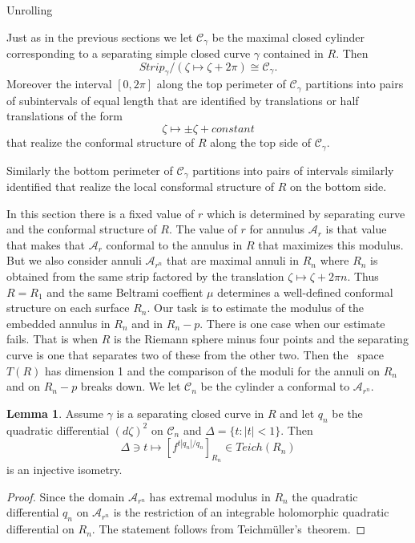 \documentclass[12pt]{amsart}
\newcommand{\tes}{Teich\-m\"ul\-ler's}
\theoremstyle{remark}
\theoremstyle{definition}
\theoremstyle{definition}
\newtheorem{lemma}{Lemma}
\begin{document}
\begin{section}{Unrolling}

Just as in the previous sections we let ${\mathcal C}_{\gamma}$ be the maximal closed cylinder  corresponding to a separating simple closed curve $\gamma$ contained in $R.$ Then 
$$Strip_{\gamma}/(\zeta \mapsto \zeta+2\pi) \cong {\mathcal C}_{\gamma}.$$ 
Moreover the interval $[0,2\pi]$ along the top perimeter of ${\mathcal C}_{\gamma}$ partitions into pairs of subintervals of equal length that are identified by translations or half translations of the form 
      $$ \zeta \mapsto \pm \zeta + constant$$
      that realize the conformal structure of $R$ along the top side of 
            ${\mathcal C}_{\gamma}.$
            
            Similarly the bottom perimeter of ${\mathcal C}_{\gamma}$ partitions into pairs of intervals similarly identified that realize the local consformal structure of $R$ on the bottom side.
 
 In this section there is a fixed value of $r$ which is determined by separating curve and the conformal structure of $R.$  The value of $r$ for annulus ${\mathcal A}_r$ is that value that makes that 
 ${\mathcal A}_r$ conformal to the annulus in $R$ that maximizes this modulus.  But we also consider annuli  ${\mathcal A}_{r^n}$ that are maximal annuli in $R_n$ where $R_n$ is obtained from the same strip factored by the translation $\zeta \mapsto \zeta + 2 \pi n.$ Thus $R=R_1$ and the same Beltrami coeffient $\mu$
 determines a well-defined conformal structure on each surface $R_n.$ Our task is to estimate the modulus of the embedded annulus in $R_n$ and in $R_n - p.$  There is one case when our estimate fails.  That is when $R$ is the Riemann sphere minus four points and the separating curve is one that separates two of these from the other two.  Then the \te\ space $T(R)$ has dimension 1 and the comparison of the moduli for the annuli on $R_n$ and on $R_n-p$ breaks down.
 We let ${\mathcal C}_n$ be the cylinder a conformal to ${\mathcal A}_{r^n}.$
   
 
 
 

 
 \begin{lemma}\label{lemmaeight} Assume $\gamma$ is a separating closed curve in $R$ and let $q_n$ be the quadratic differential $(d\zeta)^2$ on ${\mathcal C}_n$ and $\Delta= \{t:|t|<1\}.$  Then 
 $$\Delta \ni t \mapsto [f^{t|q_n|/q_n}]_{R_n} \in Teich(R_n)$$ is an injective isometry.  
 \end{lemma} 
  \begin{proof} Since the domain ${\mathcal A}_{r^n}$ has extremal modulus in $R_n$ the quadratic differential $q_n$ on ${\mathcal A}_{r^n}$ is the restriction of an integrable  holomorphic quadratic differential on $R_n.$  The statement follows from \tes\ theorem.
 \end{proof}
 

\end{section}
\end{document}
